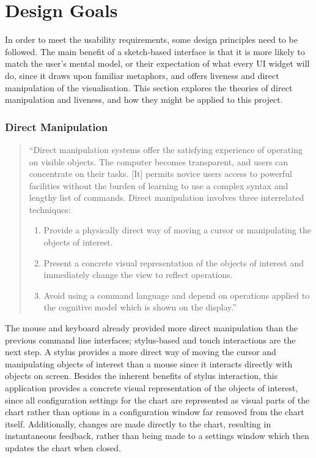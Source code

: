 	\section{Design Goals}
	In order to meet the usability requirements, some design principles need to be followed. The main benefit of a sketch-based interface is that it is more likely to match the user's mental model, or their expectation of what every UI widget will do, since it draws upon familiar metaphors, and offers liveness and direct manipulation of the visualisation. This section explores the theories of direct manipulation and liveness, and how they might be applied to this project.
	
	\subsubsection*{Direct Manipulation}
	\begin{quote}
	``Direct manipulation systems offer the satisfying experience of operating on visible objects. The computer becomes transparent, and users can concentrate on their tasks. [It] permits novice users access to powerful facilities without the burden of learning to use a complex syntax and lengthy list of commands. Direct manipulation involves three interrelated techniques: 
		\begin{enumerate}
			\item Provide a physically direct way of moving a cursor or manipulating the objects of interest.
			\item Present a concrete visual representation of the objects of interest and immediately change the view to reflect operations.
			\item Avoid using a command language and depend on operations applied to the cognitive model which is shown on the display.''
		\end{enumerate}			
	\end{quote}
	\begin{flushright}
	\citep{shneiderman_direct_1983}
	\end{flushright}
	
	The mouse and keyboard already provided more direct manipulation than the previous command line interfaces; stylus-based and touch interactions are the next step. A stylus provides a more direct way of moving the cursor and manipulating objects of interest than a mouse since it interacts directly with objects on screen. 
	Besides the inherent benefits of stylus interaction, this application provides a concrete visual representation of the objects of interest, since all configuration settings for the chart are represented as visual parts of the chart rather than options in a configuration window far removed from the chart itself. Additionally, changes are made directly to the chart, resulting in instantaneous feedback, rather than being made to a settings window which then updates the chart when closed.
	

